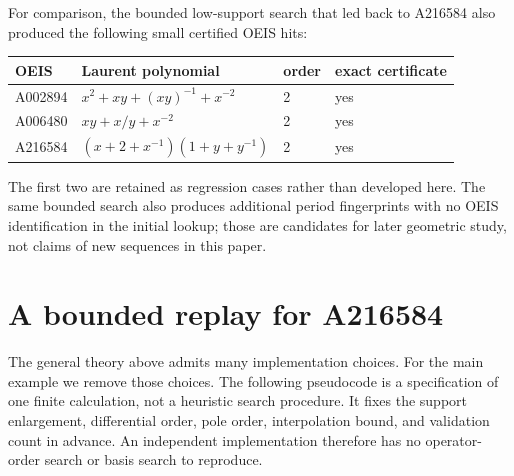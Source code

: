 \documentclass[11pt,fleqn]{article}
\theoremstyle{plain}
\begin{document}
For comparison, the bounded low-support search that led back to A216584 also
produced the following small certified OEIS hits:
\begin{center}
\small
\begin{tabular}{p{}p{}p{}p{}}
\toprule
OEIS & Laurent polynomial & order & exact certificate\\
\midrule
A002894 & \(x^2+xy+(xy)^{-1}+x^{-2}\) & 2 & yes\\
A006480 & \(xy+x/y+x^{-2}\) & 2 & yes\\
A216584 & \((x+2+x^{-1})(1+y+y^{-1})\) & 2 & yes\\
\bottomrule
\end{tabular}
\end{center}
The first two are retained as regression cases rather than developed here.
The same bounded search also produces additional period fingerprints with no
OEIS identification in the initial lookup; those are candidates for later
geometric study, not claims of new sequences in this paper.

\section{A bounded replay for A216584}\label{sec:pseudocode}

The general theory above admits many implementation choices.  For the main
example we remove those choices.  The following pseudocode is a specification
of one finite calculation, not a heuristic search procedure.  It fixes the
support enlargement, differential order, pole order, interpolation bound, and
validation count in advance.  An independent implementation therefore has no
operator-order search or basis search to reproduce.
\end{document}
